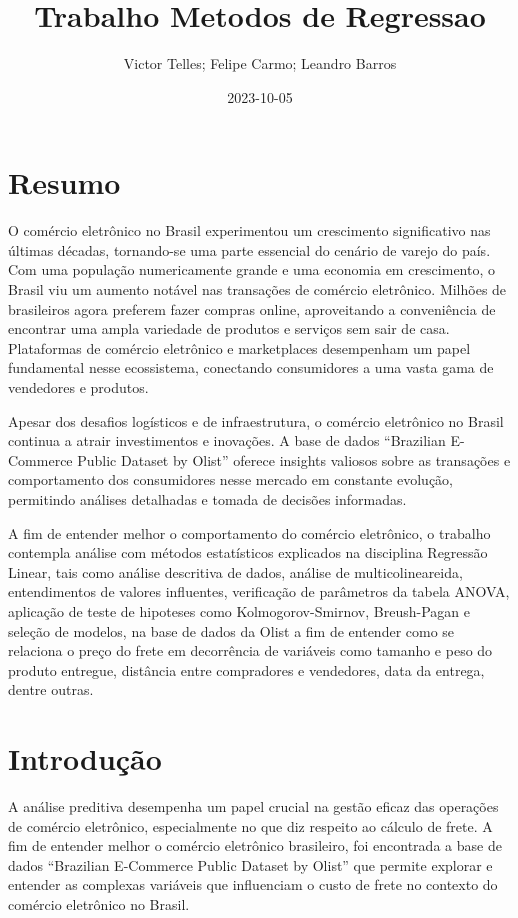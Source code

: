 \documentclass[
]{article}
\title{Trabalho Metodos de Regressao}
\author{Victor Telles; Felipe Carmo; Leandro Barros}
\date{2023-10-05}
\begin{document}
\maketitle

\hypertarget{resumo}{%
\section{Resumo}\label{resumo}}

O comércio eletrônico no Brasil experimentou um crescimento
significativo nas últimas décadas, tornando-se uma parte essencial do
cenário de varejo do país. Com uma população numericamente grande e uma
economia em crescimento, o Brasil viu um aumento notável nas transações
de comércio eletrônico. Milhões de brasileiros agora preferem fazer
compras online, aproveitando a conveniência de encontrar uma ampla
variedade de produtos e serviços sem sair de casa. Plataformas de
comércio eletrônico e marketplaces desempenham um papel fundamental
nesse ecossistema, conectando consumidores a uma vasta gama de
vendedores e produtos.

Apesar dos desafios logísticos e de infraestrutura, o comércio
eletrônico no Brasil continua a atrair investimentos e inovações. A base
de dados ``Brazilian E-Commerce Public Dataset by Olist'' oferece
insights valiosos sobre as transações e comportamento dos consumidores
nesse mercado em constante evolução, permitindo análises detalhadas e
tomada de decisões informadas.

A fim de entender melhor o comportamento do comércio eletrônico, o
trabalho contempla análise com métodos estatísticos explicados na
disciplina Regressão Linear, tais como análise descritiva de dados,
análise de multicolineareida, entendimentos de valores influentes,
verificação de parâmetros da tabela ANOVA, aplicação de teste de
hipoteses como Kolmogorov-Smirnov, Breush-Pagan e seleção de modelos, na
base de dados da Olist a fim de entender como se relaciona o preço do
frete em decorrência de variáveis como tamanho e peso do produto
entregue, distância entre compradores e vendedores, data da entrega,
dentre outras.

\hypertarget{introduuxe7uxe3o}{%
\section{Introdução}\label{introduuxe7uxe3o}}

A análise preditiva desempenha um papel crucial na gestão eficaz das
operações de comércio eletrônico, especialmente no que diz respeito ao
cálculo de frete. A fim de entender melhor o comércio eletrônico
brasileiro, foi encontrada a base de dados ``Brazilian E-Commerce Public
Dataset by Olist'' que permite explorar e entender as complexas
variáveis que influenciam o custo de frete no contexto do comércio
eletrônico no Brasil.
\end{document}
